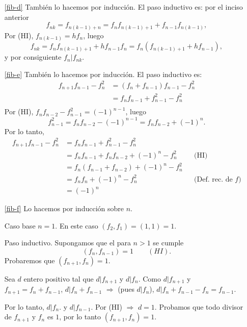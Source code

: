 \documentclass[a4paper,12pt,twoside,spanish,reqno]{amsbook}
\numberwithin{equation}{section}
\begin{document}
\begin{enumerate}
\begin{enumerate}
    \item[\ref{fib-d}]
    También lo hacemos por inducción. El paso inductivo es: por el inciso anterior
    $$
    f_{nk} = f_{n(k-1) + n} =  f_{n}f_{n(k-1)+1}+f_{n-1}f_{n(k-1)},
    $$
    Por (HI), $f_{n(k-1)} = hf_n$, luego
    $$
    f_{nk} =  f_{n}f_{n(k-1)+1}+hf_{n-1}f_n =  f_{n}(f_{n(k-1)+1}+hf_{n-1}),
    $$
    y por consiguiente $f_{n}| f_{nk}$. 
    
    \item[\ref{fib-e}] También lo hacemos por inducción. El paso inductivo es:
    \begin{align*}
        f_{n+1}f_{n-1}-f_n^2 &= (f_{n} +f_{n-1})f_{n-1}-f_n^2 \\
        &= f_{n}f_{n-1} +f_{n-1}^2-f_n^2 \\
    \end{align*}
    Por (HI), $f_{n}f_{n-2}-f_{n-1}^2=(-1)^{n-1}$, luego $$f_{n-1}^2= f_{n}f_{n-2}-(-1)^{n-1} = f_{n}f_{n-2}+(-1)^{n} .$$ Por lo tanto, 
    \begin{align*}
        f_{n+1}f_{n-1}-f_n^2 &= f_{n}f_{n-1} +f_{n-1}^2-f_n^2&& \\
        &= f_{n}f_{n-1} +f_{n}f_{n-2}+(-1)^{n} -f_n^2&&\text{(HI)} \\
        &= f_{n}(f_{n-1} +f_{n-2})+(-1)^{n} -f_n^2&& \\
        &= f_{n}f_n+(-1)^{n} -f_n^2 &&\text{(Def. rec. de $f$)}\\
        &= (-1)^{n}
    \end{align*}
    
    \item[\ref{fib-f}] Lo  hacemos por inducción sobre $n$. 
    
    Caso base $n=1$. En este caso $(f_2,f_1) = (1,1) = 1$.
    
    Paso inductivo. Supongamos que el para $n>1$  se cumple 
    \begin{equation*}
        (f_n, f_{n-1}) =1\qquad (HI).
    \end{equation*}
    Probaremos que $(f_{n+1}, f_{n}) =1$. 
    
    Sea $d$  entero positivo tal que $d|f_{n+1}$ y  $d|f_{n}$. Como $d|f_{n+1}$ y $f_{n+1} = f_n + f_{n-1}$, $d| f_n + f_{n-1}$ $\Rightarrow$ (pues $d|f_{n}$), $d| f_n + f_{n-1} -f_n =  f_{n-1}$.
    
    Por lo tanto, $d|f_{n}$. y $d|f_{n-1}$. Por (HI) $\Rightarrow$ $d=1$. Probamos que todo divisor de $f_{n+1}$ y $f_{n}$ es $1$, por lo tanto $(f_{n+1}, f_{n}) =1$. 
\end{enumerate}





\end{enumerate}
\end{document}
